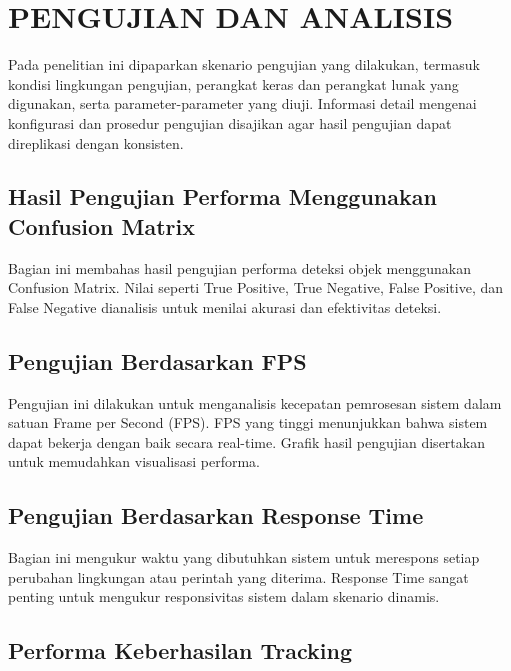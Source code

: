 \chapter{PENGUJIAN DAN ANALISIS}
\label{chap:pengujiananalisis}


Pada penelitian ini dipaparkan skenario pengujian yang dilakukan, termasuk kondisi lingkungan pengujian, perangkat keras dan perangkat lunak yang digunakan, serta parameter-parameter yang diuji. Informasi detail mengenai konfigurasi dan prosedur pengujian disajikan agar hasil pengujian dapat direplikasi dengan konsisten.

\section{Hasil Pengujian Performa Menggunakan Confusion Matrix}
\label{sec:hasilperformaconfisionMatrix}

Bagian ini membahas hasil pengujian performa deteksi objek menggunakan Confusion Matrix. Nilai seperti True Positive, True Negative, False Positive, dan False Negative dianalisis untuk menilai akurasi dan efektivitas deteksi.

\section{Pengujian Berdasarkan FPS}
\label{sec:pengujianberdasarkanfps}

Pengujian ini dilakukan untuk menganalisis kecepatan pemrosesan sistem dalam satuan Frame per Second (FPS). FPS yang tinggi menunjukkan bahwa sistem dapat bekerja dengan baik secara real-time. Grafik hasil pengujian disertakan untuk memudahkan visualisasi performa.

\section{Pengujian Berdasarkan Response Time}
\label{sec:pengujianberdasarkanresponsetime}

Bagian ini mengukur waktu yang dibutuhkan sistem untuk merespons setiap perubahan lingkungan atau perintah yang diterima. Response Time sangat penting untuk mengukur responsivitas sistem dalam skenario dinamis.

\section{Performa Keberhasilan Tracking}
\label{sec:performakeberhasiltracking}

